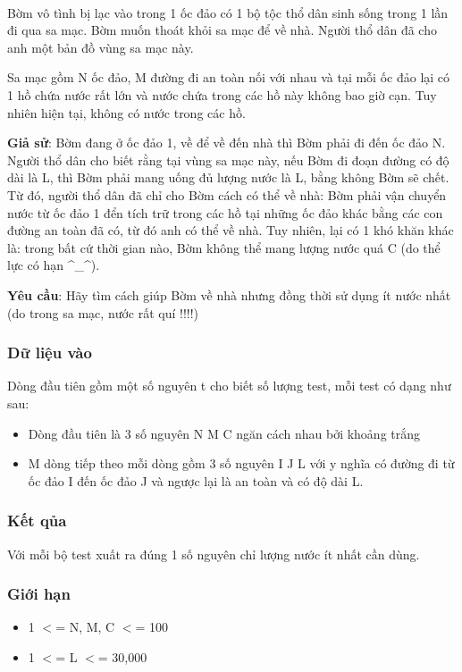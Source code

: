 

 

Bờm vô tình bị lạc vào trong 1 ốc đảo có 1 bộ tộc thổ dân sinh sống trong 1 lần đi qua sa mạc. Bờm muốn thoát khỏi sa mạc để về nhà. Người thổ dân đã cho anh một bản đồ vùng sa mạc này.

Sa mạc gồm N ốc đảo, M đường đi an toàn nối với nhau và tại mỗi ốc đảo lại có 1 hồ chứa nước rất lớn và nước chứa trong các hồ này không bao giờ cạn. Tuy nhiên hiện tại, không có nước trong các hồ.

\textbf{Giả sử}: Bờm đang ở ốc đảo 1, về để về đến nhà thì Bờm phải đi đến ốc đảo N. Người thổ dân cho biết rằng tại vùng sa mạc này, nếu Bờm đi đoạn đường có độ dài là L, thì Bờm phải mang uống đủ lượng nước là L, bằng không Bờm sẽ chết. Từ đó, người thổ dân đã chỉ cho Bờm cách có thể về nhà: Bờm phải vận chuyển nước từ ốc đảo 1 đển tích trữ trong các hồ tại những ốc đảo khác bằng các con đường an toàn đã có, từ đó anh có thể về nhà. Tuy nhiên, lại có 1 khó khăn khác là: trong bất cứ thời gian nào, Bờm không thể mang lượng nước quá C (do thể lực có hạn \textasciicircum\_\textasciicircum).

\textbf{Yêu cầu}: Hãy tìm cách giúp Bờm về nhà nhưng đồng thời sử dụng ít nước nhất (do trong sa mạc, nước rất quí !!!!)

\subsubsection{Dữ liệu vào}

Dòng đầu tiên gồm một số nguyên t cho biết số lượng test, mỗi test có dạng như sau:
\begin{itemize}
	\item Dòng đầu tiên là 3 số nguyên N M C ngăn cách nhau bởi khoảng trắng
	\item M dòng tiếp theo mỗi dòng gồm 3 số nguyên I J L với y nghĩa có đường đi từ ốc đảo I đến ốc đảo J và ngược lại là an toàn và có độ dài L.
\end{itemize}

\subsubsection{Kết qủa}

Với mỗi bộ test xuất ra đúng 1 số nguyên chỉ lượng nước ít nhất cần dùng.

\subsubsection{Giới hạn}
\begin{itemize}
	\item 1 $<$= N, M, C $<$= 100
	\item 1 $<$= L $<$= 30,000
\end{itemize}

